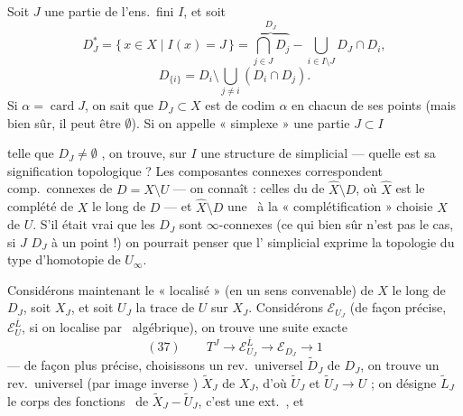 \documentclass[11pt,a4paper]{article}
\begin{document}

Soit $J$ une partie de l'ens.\ fini $I$, et soit
\[
  D_J^{*} = \{\, x \in X \mid I(x) = J \,\} = \overbrace{\bigcap_{j \in J} D_j}^{D_J} - \bigcup_{i \in I \setminus J} D_J \cap D_i ,
\]
\[
  D_{\{i\}} = D_i \setminus \bigcup_{j \neq i} (D_i \cap D_j).
\]
Si $\alpha = \operatorname{card} J$, on sait que $D_J \subset X$ est  de codim $\alpha$ en chacun de ses points (mais bien sûr, il peut être $\emptyset$). Si on appelle « simplexe » une partie $J \subset I$



telle que $D_J \neq \emptyset$ , on trouve, sur $I$ une structure de   simplicial — quelle est sa signification topologique ? Les composantes connexes correspondent  comp.\ connexes de $D = X \setminus U$ — on connaît : celles du  de $\widehat{X} \setminus D$, où $\widehat{X}$ est le  complété de $X$ le long de $D$ — et $\widehat{X} \setminus D$ \ill{} une   \ à la « complétification » choisie $X$ de $U$. S'il était vrai que les $D_J$  sont $\infty$-connexes (ce qui bien sûr n'est pas le cas, si $J$  $D_J$  à un point !) on pourrait penser que l'  simplicial exprime la topologie du type d'homotopie de $U_{\infty}$.

Considérons maintenant le « localisé » \struck{\ill{}} (en un sens  convenable) de $X$ le long de $D_J$, soit  $X_J$, et soit $U_J$  la trace de $U$ sur $X_J$. Considérons $\mathcal{E}_{U_J}$ (de façon précise, $\mathcal{E}_U^{\overline{L}}$, si on localise par \ algébrique), on trouve une suite exacte
\[
  (37) \qquad T^{J} \to \mathcal{E}_{U_J}^{\overline{L}} \to \mathcal{E}_{D_J} \to 1
\]
— de façon plus précise, choisissons un rev.\ universel $\widetilde{D}_J$ de $D_J$, on trouve un rev.\ universel (par image inverse ) $\widetilde{X}_J$ de $X_J$, d'où  $\widetilde{U}_J$ et $\widetilde{U}_J \to U$ ;  on désigne $\widetilde{L}_J$ le corps des fonctions \ de $\widetilde{X}_J - \widetilde{U}_J$, c'est une ext.\ , et
\end{document}

